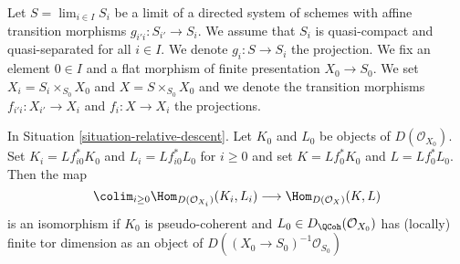 \begin{situation}
\label{situation-relative-descent}
Let $S = \lim_{i \in I} S_i$ be a limit of a directed system of schemes
with affine transition morphisms $g_{i'i} : S_{i'} \to S_i$.
We assume that $S_i$ is quasi-compact and quasi-separated for all $i \in I$.
We denote $g_i : S \to S_i$ the projection. We fix an element $0 \in I$
and a flat morphism of finite presentation $X_0 \to S_0$.
We set $X_i = S_i \times_{S_0} X_0$ and $X = S \times_{S_0} X_0$
and we denote the transition morphisms $f_{i'i} : X_{i'} \to X_i$
and $f_i : X \to X_i$ the projections.
\end{situation}

\begin{lemma}
\label{lemma-relative-descend-homomorphisms}
In Situation \ref{situation-relative-descent}.
Let $K_0$ and $L_0$ be objects of $D(\mathcal{O}_{X_0})$.
Set $K_i = Lf_{i0}^*K_0$ and $L_i = Lf_{i0}^*L_0$ for $i \geq 0$
and set $K = Lf_0^*K_0$ and $L = Lf_0^*L_0$. Then the map
$$
\colim_{i \geq 0} \Hom_{D(\mathcal{O}_{X_i})}(K_i, L_i)
\longrightarrow
\Hom_{D(\mathcal{O}_X)}(K, L)
$$
is an isomorphism if $K_0$ is pseudo-coherent and
$L_0 \in D_\QCoh(\mathcal{O}_{X_0})$ has (locally)
finite tor dimension as an object of
$D((X_0 \to S_0)^{-1}\mathcal{O}_{S_0})$
\end{lemma}

